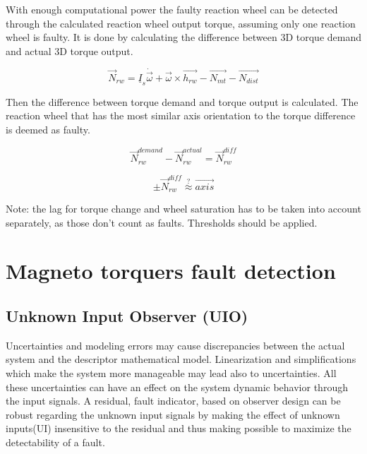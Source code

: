With enough computational power the faulty reaction wheel can be detected through the calculated reaction wheel output torque, assuming only one reaction wheel is faulty. It is done by calculating the difference between 3D torque demand and actual 3D torque output. 

\begin{equation}
\vec{N}_{rw} = \underline{I}_s \dot{\vec{\omega}}  + \vec{\omega} \times \vec{h_{rw}} - \vec{N_{mt}} - \vec{N_{dist}}
\end{equation}

Then the difference between torque demand and torque output is calculated. The reaction wheel that has the most similar axis orientation to the torque difference is deemed as faulty.

\begin{equation}
\vec{N}_{rw}^{demand} - \vec{N}_{rw}^{actual} = 
\vec{N}_{rw}^{diff}
\end{equation}

\begin{equation}
 \pm \vec{N}_{rw}^{diff}  \stackrel{?}{\approx} \vec{axis} 
\end{equation}



Note: the lag for torque change and wheel saturation has to be taken into account separately, as those don't count as faults. 
Thresholds should be applied.

\section{Magneto torquers  fault detection}

\subsection{Unknown Input Observer (UIO)}

Uncertainties and modeling errors may cause discrepancies between the actual system and the descriptor mathematical model. Linearization and simplifications which make the system more manageable may lead also to uncertainties. All these uncertainties can have an effect on the system dynamic behavior through the input signals.   
A residual, fault indicator, based on observer design can be robust regarding the unknown input signals by making the effect of unknown inputs(UI) insensitive to the residual and thus making possible to maximize the detectability of a fault.       